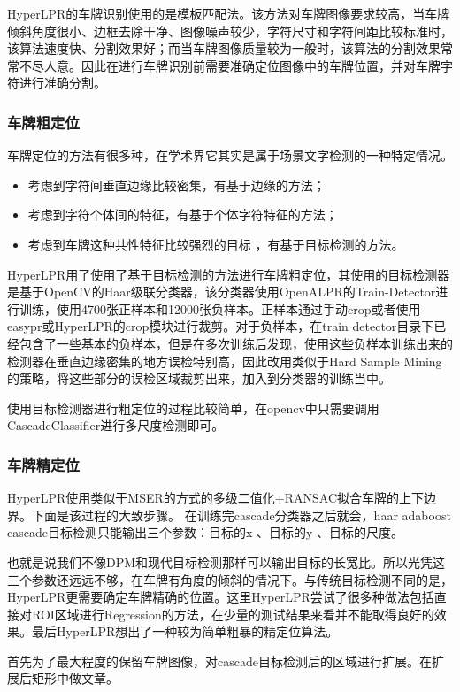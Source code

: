HyperLPR的车牌识别使用的是模板匹配法。该方法对车牌图像要求较高，当车牌倾斜角度很小、边框去除干净、图像噪声较少，字符尺寸和字符间距比较标准时，该算法速度快、分割效果好；而当车牌图像质量较为一般时，该算法的分割效果常常不尽人意。因此在进行车牌识别前需要准确定位图像中的车牌位置，并对车牌字符进行准确分割。

\subsubsection{车牌粗定位}
车牌定位的方法有很多种，在学术界它其实是属于场景文字检测的一种特定情况。
\begin{itemize}
	\item 考虑到字符间垂直边缘比较密集，有基于边缘的方法；
	\item 考虑到字符个体间的特征，有基于个体字符特征的方法；
	\item 考虑到车牌这种共性特征比较强烈的目标 ，有基于目标检测的方法。
\end{itemize}
HyperLPR用了使用了基于目标检测的方法进行车牌粗定位，其使用的目标检测器是基于OpenCV的Haar级联分类器，该分类器使用OpenALPR的Train-Detector进行训练，使用4700张正样本和12000张负样本。正样本通过手动crop或者使用easypr或HyperLPR的crop模块进行裁剪。对于负样本，在train detector目录下已经包含了一些基本的负样本，但是在多次训练后发现，使用这些负样本训练出来的检测器在垂直边缘密集的地方误检特别高，因此改用类似于Hard Sample Mining的策略，将这些部分的误检区域裁剪出来，加入到分类器的训练当中。

使用目标检测器进行粗定位的过程比较简单，在opencv中只需要调用CascadeClassifier进行多尺度检测即可。

\subsubsection{车牌精定位}
HyperLPR使用类似于MSER的方式的多级二值化+RANSAC拟合车牌的上下边界。下面是该过程的大致步骤。
在训练完cascade分类器之后就会，haar adaboost cascade目标检测只能输出三个参数：目标的x 、目标的y 、目标的尺度。

也就是说我们不像DPM和现代目标检测那样可以输出目标的长宽比。所以光凭这三个参数还远远不够，在车牌有角度的倾斜的情况下。与传统目标检测不同的是，HyperLPR更需要确定车牌精确的位置。这里HyperLPR尝试了很多种做法包括直接对ROI区域进行Regression的方法，在少量的测试结果来看并不能取得良好的效果。最后HyperLPR想出了一种较为简单粗暴的精定位算法。

首先为了最大程度的保留车牌图像，对cascade目标检测后的区域进行扩展。在扩展后矩形中做文章。

